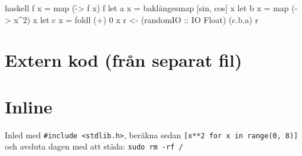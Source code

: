 \documentclass[a4paper, article, oneside, leqno]{memoir}
\begin{document}
\begin{internallisting}{haskell}
  f x = map (\f -> f x) f
  let a x = baklängesmap [sin, cos] x
  let b x = map (\x -> x^2) x
  let c x = foldl (+) 0 x
  r <- (randomIO :: IO Float)
  (c.b.a) r
\end{internallisting}

\section{Extern kod (från separat fil)}


\section{Inline}

Inled med \texttt{#include <stdlib.h>}, beräkna sedan \texttt{[x**2 for x in range(0, 8)]} och avsluta dagen med att städa: \texttt{sudo rm -rf /}
\end{document}
